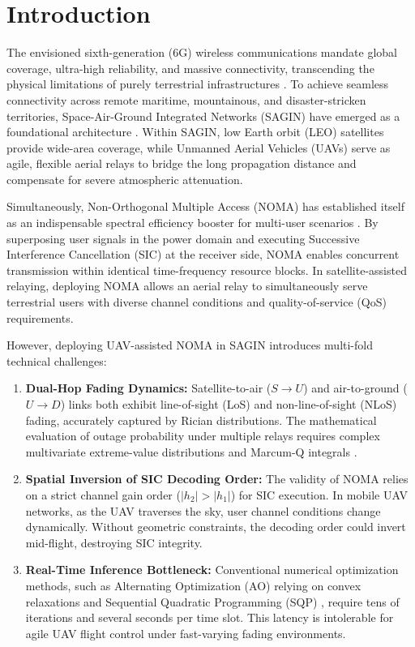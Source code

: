 \section{Introduction}
\label{sec:intro}

The envisioned sixth-generation (6G) wireless communications mandate global coverage, ultra-high reliability, and massive connectivity, transcending the physical limitations of purely terrestrial infrastructures \cite{liu2018space, ding2017survey}. To achieve seamless connectivity across remote maritime, mountainous, and disaster-stricken territories, Space-Air-Ground Integrated Networks (SAGIN) have emerged as a foundational architecture \cite{zeng2019accessing}. Within SAGIN, low Earth orbit (LEO) satellites provide wide-area coverage, while Unmanned Aerial Vehicles (UAVs) serve as agile, flexible aerial relays to bridge the long propagation distance and compensate for severe atmospheric attenuation.

Simultaneously, Non-Orthogonal Multiple Access (NOMA) has established itself as an indispensable spectral efficiency booster for multi-user scenarios \cite{ding2017survey}. By superposing user signals in the power domain and executing Successive Interference Cancellation (SIC) at the receiver side, NOMA enables concurrent transmission within identical time-frequency resource blocks. In satellite-assisted relaying, deploying NOMA allows an aerial relay to simultaneously serve terrestrial users with diverse channel conditions and quality-of-service (QoS) requirements.

However, deploying UAV-assisted NOMA in SAGIN introduces multi-fold technical challenges:
\begin{enumerate}
    \item \textbf{Dual-Hop Fading Dynamics:} Satellite-to-air ($S \to U$) and air-to-ground ($U \to D$) links both exhibit line-of-sight (LoS) and non-line-of-sight (NLoS) fading, accurately captured by Rician distributions. The mathematical evaluation of outage probability under multiple relays requires complex multivariate extreme-value distributions and Marcum-Q integrals \cite{alouini2001digital}.
    \item \textbf{Spatial Inversion of SIC Decoding Order:} The validity of NOMA relies on a strict channel gain order ($|h_2| > |h_1|$) for SIC execution. In mobile UAV networks, as the UAV traverses the sky, user channel conditions change dynamically. Without geometric constraints, the decoding order could invert mid-flight, destroying SIC integrity.
    \item \textbf{Real-Time Inference Bottleneck:} Conventional numerical optimization methods, such as Alternating Optimization (AO) relying on convex relaxations and Sequential Quadratic Programming (SQP) \cite{wu2018joint}, require tens of iterations and several seconds per time slot. This latency is intolerable for agile UAV flight control under fast-varying fading environments.
\end{enumerate}

